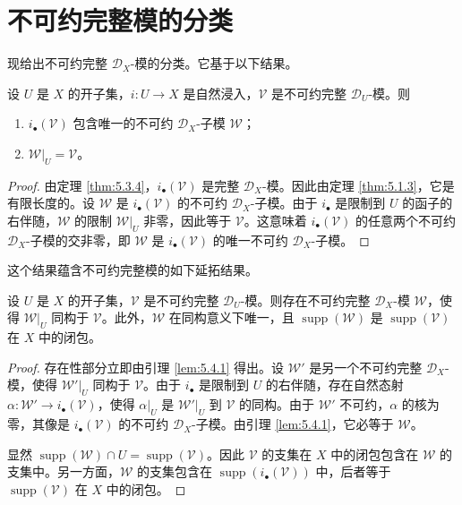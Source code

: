 \section{不可约完整模的分类}

现给出不可约完整 $\mathcal{D}_X$-模的分类。它基于以下结果。

\begin{lemma}\label{lem:5.4.1}
设 $U$ 是 $X$ 的开子集，$i:U\to X$ 是自然浸入，$\mathcal{V}$ 是不可约完整 $\mathcal{D}_U$-模。则
\begin{enumerate}[label=(\roman*)]
  \item $i_\bullet(\mathcal{V})$ 包含唯一的不可约 $\mathcal{D}_X$-子模 $\mathcal{W}$；
  \item $\mathcal{W}|_U=\mathcal{V}$。
\end{enumerate}
\end{lemma}

\begin{proof}
由定理 \ref{thm:5.3.4}，$i_\bullet(\mathcal{V})$ 是完整 $\mathcal{D}_X$-模。因此由定理 \ref{thm:5.1.3}，它是有限长度的。设 $\mathcal{W}$ 是 $i_\bullet(\mathcal{V})$ 的不可约 $\mathcal{D}_X$-子模。由于 $i_\bullet$ 是限制到 $U$ 的函子的右伴随，$\mathcal{W}$ 的限制 $\mathcal{W}|_U$ 非零，因此等于 $\mathcal{V}$。这意味着 $i_\bullet(\mathcal{V})$ 的任意两个不可约 $\mathcal{D}_X$-子模的交非零，即 $\mathcal{W}$ 是 $i_\bullet(\mathcal{V})$ 的唯一不可约 $\mathcal{D}_X$-子模。
\end{proof}

这个结果蕴含不可约完整模的如下延拓结果。

\begin{corollary}\label{cor:5.4.2}
设 $U$ 是 $X$ 的开子集，$\mathcal{V}$ 是不可约完整 $\mathcal{D}_U$-模。则存在不可约完整 $\mathcal{D}_X$-模 $\mathcal{W}$，使得 $\mathcal{W}|_U$ 同构于 $\mathcal{V}$。此外，$\mathcal{W}$ 在同构意义下唯一，且 $\operatorname{supp}(\mathcal{W})$ 是 $\operatorname{supp}(\mathcal{V})$ 在 $X$ 中的闭包。
\end{corollary}

\begin{proof}
存在性部分立即由引理 \ref{lem:5.4.1} 得出。设 $\mathcal{W}'$ 是另一个不可约完整 $\mathcal{D}_X$-模，使得 $\mathcal{W}'|_U$ 同构于 $\mathcal{V}$。由于 $i_\bullet$ 是限制到 $U$ 的右伴随，存在自然态射
$\alpha:\mathcal{W}'\to i_\bullet(\mathcal{V})$，使得 $\alpha|_U$ 是 $\mathcal{W}'|_U$ 到 $\mathcal{V}$ 的同构。由于 $\mathcal{W}'$ 不可约，$\alpha$ 的核为零，其像是 $i_\bullet(\mathcal{V})$ 的不可约 $\mathcal{D}_X$-子模。由引理 \ref{lem:5.4.1}，它必等于 $\mathcal{W}$。

显然 $\operatorname{supp}(\mathcal{W})\cap U=\operatorname{supp}(\mathcal{V})$。因此 $\mathcal{V}$ 的支集在 $X$ 中的闭包包含在 $\mathcal{W}$ 的支集中。另一方面，$\mathcal{W}$ 的支集包含在 $\operatorname{supp}(i_\bullet(\mathcal{V}))$ 中，后者等于 $\operatorname{supp}(\mathcal{V})$ 在 $X$ 中的闭包。
\end{proof}

